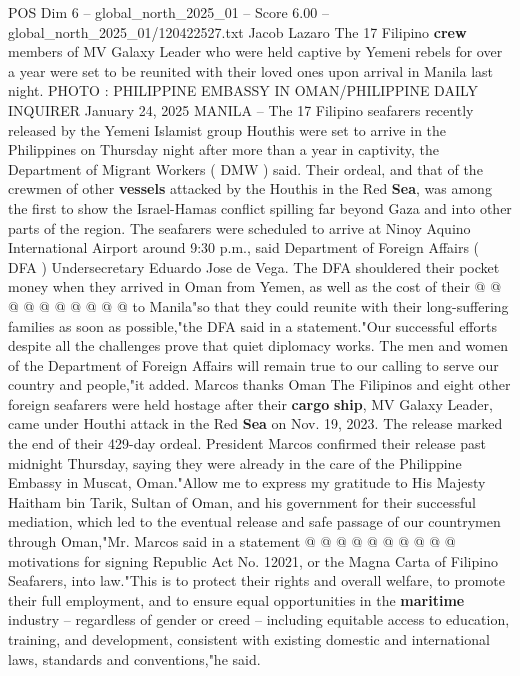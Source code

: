 \begin{textsample}{POS Dim 6 – global\_north\_2025\_01 – Score 6.00 – global\_north\_2025\_01/120422527.txt}  \label{ex:f6_pos_276}
Jacob Lazaro The 17 Filipino \textbf{crew} members of MV Galaxy Leader who were held captive by Yemeni rebels for over a year were set to be reunited with their loved ones upon arrival in Manila last night.
PHOTO : PHILIPPINE EMBASSY IN OMAN/PHILIPPINE DAILY INQUIRER January 24, 2025 MANILA -- The 17 Filipino seafarers recently released by the Yemeni Islamist group Houthis were set to arrive in the Philippines on Thursday night after more than a year in captivity, the Department of Migrant Workers ( DMW ) said.
Their ordeal, and that of the crewmen of other \textbf{vessels} attacked by the Houthis in the Red \textbf{Sea}, was among the first to show the Israel-Hamas conflict spilling far beyond Gaza and into other parts of the region.
The seafarers were scheduled to arrive at Ninoy Aquino International Airport around 9:30 p.m., said Department of Foreign Affairs ( DFA ) Undersecretary Eduardo Jose de Vega.
The DFA shouldered their pocket money when they arrived in Oman from Yemen, as well as the cost of their @ @ @ @ @ @ @ @ @ @ to Manila"so that they could reunite with their long-suffering families as soon as possible,"the DFA said in a statement."Our successful efforts despite all the challenges prove that quiet diplomacy works.
The men and women of the Department of Foreign Affairs will remain true to our calling to serve our country and people,"it added.
Marcos thanks Oman The Filipinos and eight other foreign seafarers were held hostage after their \textbf{cargo} \textbf{ship}, MV Galaxy Leader, came under Houthi attack in the Red \textbf{Sea} on Nov. 19, 2023.
The release marked the end of their 429-day ordeal.
President Marcos confirmed their release past midnight Thursday, saying they were already in the care of the Philippine Embassy in Muscat, Oman."Allow me to express my gratitude to His Majesty Haitham bin Tarik, Sultan of Oman, and his government for their successful mediation, which led to the eventual release and safe passage of our countrymen through Oman,"Mr.
Marcos said in a statement @ @ @ @ @ @ @ @ @ @ motivations for signing Republic Act No. 12021, or the Magna Carta of Filipino Seafarers, into law."This is to protect their rights and overall welfare, to promote their full employment, and to ensure equal opportunities in the \textbf{maritime} industry -- regardless of gender or creed -- including equitable access to education, training, and development, consistent with existing domestic and international laws, standards and conventions,"he said.

\end{textsample}
